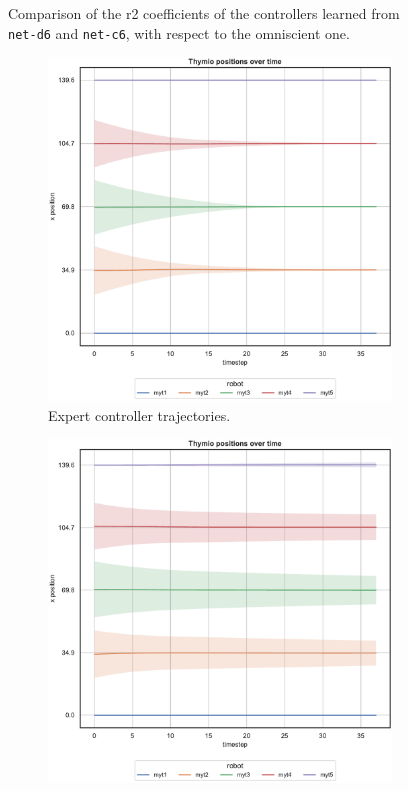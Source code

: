 \begin{figure}[!htb]
\begin{center}
\begin{subfigure}[h]{0.49\textwidth}
		\end{subfigure}
	\end{center}
	\caption[Evaluation of the \gls{r2} coefficients of \texttt{net-c6}.]{Comparison 
	of the \gls{r2} coefficients of the controllers learned from \texttt{net-d6} and 
	\texttt{net-c6}, with respect to the omniscient one.}
	\label{fig:net-c6r2}
\end{figure}

\begin{figure}[!htb]
	\begin{center}
		\begin{subfigure}[h]{0.49\textwidth}
			\centering
			\includegraphics[width=.9\textwidth]{contents/images/net-d6/position-overtime-omniscient}%
			\caption{Expert controller trajectories.}
		\end{subfigure}
		\hfill
		\begin{subfigure}[h]{0.49\textwidth}
			\centering
			\includegraphics[width=.9\textwidth]{contents/images/net-d6/position-overtime-learned_distributed}

\end{subfigure}
\end{center}
\end{figure}
